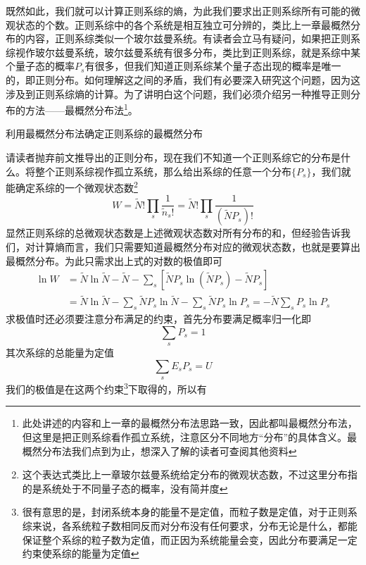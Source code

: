 \documentclass[../../main.tex]{subfiles}
\begin{document}
既然如此，我们就可以计算正则系综的熵，为此我们要求出正则系综所有可能的微观状态的个数。正则系综中的各个系统是相互独立可分辨的，类比上一章最概然分布的内容，正则系综类似一个玻尔兹曼系统。有读者会立马有疑问，如果把正则系综视作玻尔兹曼系统，玻尔兹曼系统有很多分布，类比到正则系综，就是系综中某个量子态的概率\(P_s\)有很多，但我们知道正则系综某个量子态出现的概率是唯一的，即正则分布。如何理解这之间的矛盾，我们有必要深入研究这个问题，因为这涉及到正则系综熵的计算。为了讲明白这个问题，我们必须介绍另一种推导正则分布的方法——最概然分布法\footnote{此处讲述的内容和上一章的最概然分布法思路一致，因此都叫最概然分布法，但这里是把正则系综看作孤立系统，注意区分不同地方“分布”的具体含义。最概然分布法我们点到为止，想深入了解的读者可查阅其他资料}。
\begin{example}
    利用最概然分布法确定正则系综的最概然分布
    \begin{solution}
        请读者抛弃前文推导出的正则分布，现在我们不知道一个正则系综它的分布是什么。将整个正则系综视作孤立系统，那么给出系综的任意一个分布\(\{P_s\}\)，我们就能确定系综的一个微观状态数\footnote{这个表达式类比上一章玻尔兹曼系统给定分布的微观状态数，不过这里分布指的是系统处于不同量子态的概率，没有简并度}
        \begin{equation}
            W=\tilde{N}!\prod_s \frac{1}{\tilde{n}_s !}=\tilde{N}!\prod_s \frac{1}{(\tilde{N}P_s)!}
        \end{equation}
        显然正则系综的总微观状态数是上述微观状态数对所有分布的和，但经验告诉我们，对计算熵而言，我们只需要知道最概然分布对应的微观状态数，也就是要算出最概然分布。为此只需求出上式的对数的极值即可
        \begin{equation}\label{eq:系综微观状态数}
            \begin{split}
                \ln W &=\tilde{N}\ln\tilde{N}-\tilde{N}-\sum_s\left[\tilde{N}P_s\ln(\tilde{N}P_s)-\tilde{N}P_s\right] \\
                &=\tilde{N}\ln\tilde{N}-\sum_s\tilde{N}P_s\ln\tilde{N}-\sum_s\tilde{N}P_s\ln P_s=-\tilde{N}\sum_sP_s\ln P_s
            \end{split} 
        \end{equation}
        求极值时还必须要注意分布满足的约束，首先分布要满足概率归一化即
        \begin{equation}
            \sum_s P_s=1
        \end{equation}
        其次系综的总能量为定值
        \begin{equation}
            \sum_s E_sP_s=U
        \end{equation}
        我们的极值是在这两个约束\footnote{很有意思的是，封闭系统本身的能量不是定值，而粒子数是定值，对于正则系综来说，各系统粒子数相同反而对分布没有任何要求，分布无论是什么，都能保证整个系综的粒子数为定值，而正因为系统能量会变，因此分布要满足一定约束使系综的能量为定值}下取得的，所以有

\end{solution}
\end{example}
\end{document}
